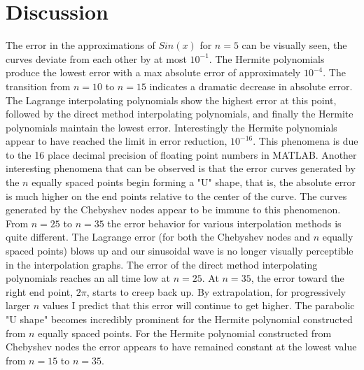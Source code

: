 \documentclass[11pt]{article}%
\begin{document}
\section*{Discussion}
The error in the approximations of $Sin(x)$ for $n = 5$ can be visually seen, the curves deviate from each other by at most $10^{-1}$. The Hermite polynomials produce the lowest error with a max absolute error of approximately $10^{-4}$. The transition from $n = 10$ to $n = 15$ indicates a dramatic decrease in absolute error. The Lagrange interpolating polynomials show the highest error at this point, followed by the direct method interpolating polynomials, and finally the Hermite polynomials maintain the lowest error. Interestingly the Hermite polynomials appear to have reached the limit in error reduction, $10^{-16}$. This phenomena is due to the 16 place decimal precision of floating point numbers in MATLAB. Another interesting phenomena that can be observed is that the error curves generated by the $n$ equally spaced points begin forming a "U" shape, that is, the absolute error is much higher on the end points relative to the center of the curve. The curves generated by the Chebyshev nodes appear to be immune to this phenomenon. From $n = 25$ to $n = 35$ the error behavior for various interpolation methods is quite different. The Lagrange error (for both the Chebyshev nodes and $n$ equally spaced points) blows up and our sinusoidal wave is no longer visually perceptible in the interpolation graphs. The error of the direct method interpolating polynomials reaches an all time low at $n = 25$. At $n = 35$, the error toward the right end point, $2\pi$, starts to creep back up. By extrapolation, for progressively larger $n$ values I predict that this error will continue to get higher. The parabolic "U shape" becomes incredibly prominent for the Hermite polynomial constructed from $n$ equally spaced points. For the Hermite polynomial constructed from Chebyshev nodes the error appears to have remained constant at the lowest value from $n=15$ to $n = 35$.
\end{document}
